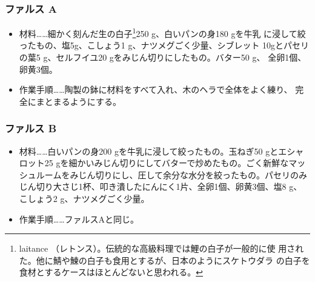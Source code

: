 \begin{recette}
\hypertarget{farces-poissons-braises-a}{%
\subsubsection{ファルス A}\label{farces-poissons-braises-a}}



\begin{itemize}
\item
  材料\ldots{}\ldots{}細かく刻んだ生の白子\footnote{laitance
    （レトンス）。伝統的な高級料理では鯉の白子が一般的に使
    用された。他に鯖や鰊の白子も食用とするが、日本のようにスケトウダラ
    の白子を食材とするケースはほとんどないと思われる。}250
  g、白いパンの身180 gを牛乳 に浸して絞ったもの、塩5g、こしょう1
  g、ナツメグごく少量、シブレット 10gとパセリの葉5 g、セルフイユ20
  gをみじん切りにしたもの。バター50 g、 全卵1個、卵黄3個。
\item
  作業手順\ldots{}\ldots{}陶製の鉢に材料をすべて入れ、木のヘラで全体をよく練り、
  完全にまとまるようにする。
\end{itemize}

\hypertarget{farces-poissons-braises-b}{%
\subsubsection{ファルス B}\label{farces-poissons-braises-b}}



\begin{itemize}
\item
  材料\ldots{}\ldots{}白いパンの身200
  gを牛乳に浸して絞ったもの。玉ねぎ50 gとエシャロット25
  gを細かいみじん切りにしてバターで炒めたもの。ごく新鮮なマッシュルームをみじん切りにし、圧して余分な水分を絞ったもの。パセリのみじん切り大さじ1杯、叩き潰したにんにく1片、全卵1個、卵黄3個、塩8
  g、こしょう2 g、ナツメグごく少量。
\item
  作業手順\ldots{}\ldots{}ファルスAと同じ。
\end{itemize}
\end{recette}
